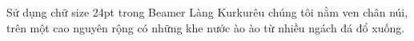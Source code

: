\documentclass[24pt,a4paper]{beamer}
\begin{document}
\begin{frame}{Sử dụng chữ size 24pt trong Beamer}
\justifying
Làng Kurkurêu chúng tôi nằm ven chân núi, trên một cao nguyên rộng có những khe nước ào ào từ nhiều ngách đá đổ xuống.
\end{frame}
\end{document}
